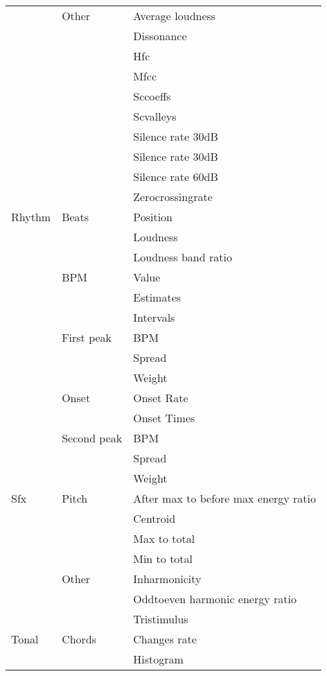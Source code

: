 \begin{center}
\begin{longtable}{ p{} p{} p{} }
& Other & Average loudness \\ \cmidrule(r){3-3}
& & Dissonance \\ \cmidrule(r){3-3}
& & Hfc \\ \cmidrule(r){3-3}
& & Mfcc \\ \cmidrule(r){3-3}
& & Sccoeffs \\ \cmidrule(r){3-3}
& & Scvalleys \\ \cmidrule(r){3-3}
& & Silence rate 30dB \\ \cmidrule(r){3-3}
& & Silence rate 30dB \\ \cmidrule(r){3-3}
& & Silence rate 60dB \\ \cmidrule(r){3-3}
& & Zerocrossingrate \\ \midrule
Rhythm & Beats & Position \\ \cmidrule(r){3-3}
& & Loudness \\ \cmidrule(r){3-3}
& & Loudness band ratio \\ \cmidrule(r){2-3}
& BPM & Value \\ \cmidrule(r){3-3}
& & Estimates \\ \cmidrule(r){3-3}
& & Intervals \\ \cmidrule(r){2-3}
& First peak & BPM \\ \cmidrule(r){3-3}
& & Spread \\ \cmidrule(r){3-3}
& & Weight \\ \cmidrule(r){2-3}
& Onset & Onset Rate \\ \cmidrule(r){3-3}
& & Onset Times \\ \cmidrule(r){2-3}
& Second peak & BPM \\ \cmidrule(r){3-3}
& & Spread \\ \cmidrule(r){3-3}
& & Weight \\ \midrule
Sfx & Pitch & After max to before max energy ratio \\ \cmidrule(r){3-3}
& & Centroid \\ \cmidrule(r){3-3}
& & Max to total \\ \cmidrule(r){3-3}
& & Min to total \\ \cmidrule(r){2-3}
& Other & Inharmonicity \\ \cmidrule(r){3-3}
& & Oddtoeven harmonic energy ratio \\ \cmidrule(r){3-3}
& & Tristimulus \\ \midrule
Tonal & Chords & Changes rate \\ \cmidrule(r){3-3}
& & Histogram \\ \cmidrule(r){3-3}

\end{longtable}
\end{center}
